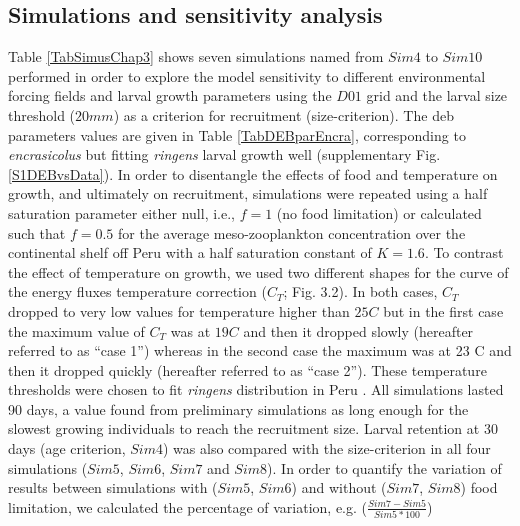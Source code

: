 \subsection{Simulations and sensitivity analysis}
Table \ref{TabSimusChap3} shows seven simulations named from $Sim4$ to $Sim10$ performed in order
to explore the model sensitivity to different environmental forcing fields and larval growth
parameters using the $D01$ grid and the larval size threshold ($20 mm$) as a criterion for
recruitment (size-criterion). The \acrshort{deb} parameters values are given in Table \ref{TabDEBparEncra}, corresponding to \textit{\gls{encrasicolus}} \citep{PethRoos2013} but fitting \textit{\gls{ringens}} larval growth well (supplementary Fig. \ref{S1DEBvsData}). In order to disentangle the effects of food and temperature on growth, and ultimately on recruitment, simulations were repeated using a half saturation parameter either null, i.e., $f = 1$ (no food limitation) or calculated such that $f = 0.5$ for the average meso-zooplankton concentration over the continental shelf off Peru with a half saturation constant of $K = 1.6$. To contrast the effect of temperature on growth, we used two different shapes for the curve of the energy fluxes temperature correction ($C_{T}$;
Fig. 3.2). In both cases, $C_{T}$ dropped to very low values for temperature higher than $25$\textdegree $C$ but in the first case the maximum value of $C_{T}$ was at $19$\textdegree $C$ and then it dropped slowly (hereafter referred to as “case 1”) whereas in the second case the maximum was at 23
\textdegree C and then it dropped quickly (hereafter referred to as “case 2”). These temperature
thresholds were chosen to fit \textit{\gls{ringens}} distribution in Peru \citep{CastPena2022}. All simulations lasted 90 days, a value found from preliminary simulations as long enough for the slowest growing individuals to reach the recruitment size. Larval retention at 30 days (age criterion, $Sim 4$) was also compared with the size-criterion in all four simulations ($Sim 5$, $Sim 6$, $Sim 7$ and $Sim 8$). In order to quantify the variation of results between simulations with ($Sim 5$, $Sim 6$) and without ($Sim 7$, $Sim 8$) food limitation, we calculated the percentage of variation, e.g. ($\frac{Sim 7-Sim 5}{Sim 5*100}$)

